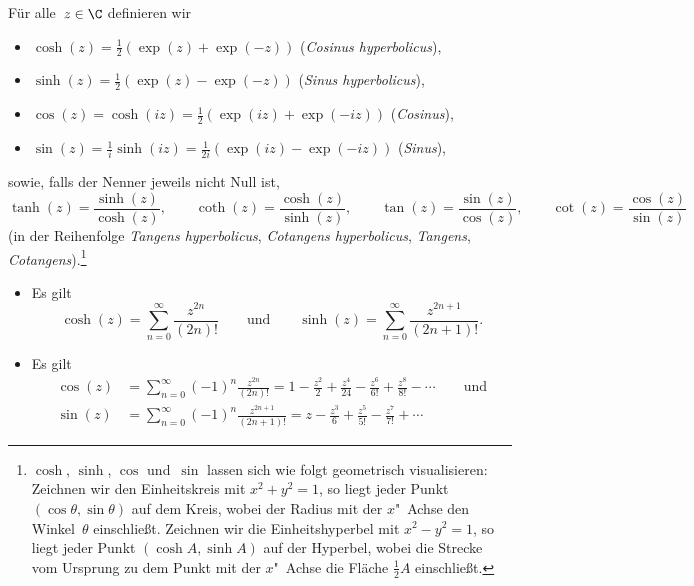 \documentclass[a4paper]{article}
\begin{document}
\begin{definition}
    Für alle~$z \in \C$ definieren wir
    \begin{itemize}
        \item $\cosh(z) = \frac{1}{2}(\exp(z)+\exp(-z))$ (\emph{Cosinus hyperbolicus}),
        \item $\sinh(z) = \frac{1}{2}(\exp(z)-\exp(-z))$ (\emph{Sinus hyperbolicus}),
        \item $\cos(z) = \cosh(iz) = \frac{1}{2}(\exp(iz)+\exp(-iz))$ (\emph{Cosinus}),
        \item $\sin(z) = \frac{1}{i}\sinh(iz) = \frac{1}{2i}(\exp(iz)-\exp(-iz))$ (\emph{Sinus}),
    \end{itemize}
    sowie, falls der Nenner jeweils nicht Null ist,
    \begin{equation*}
        \tanh(z) = \frac{\sinh(z)}{\cosh(z)}, \qquad \coth(z) = \frac{\cosh(z)}{\sinh(z)}, \qquad \tan(z) = \frac{\sin(z)}{\cos(z)}, \qquad \cot(z) = \frac{\cos(z)}{\sin(z)}
    \end{equation*}
    (in der Reihenfolge \emph{Tangens hyperbolicus}, \emph{Cotangens hyperbolicus}, \emph{Tangens}, \emph{Cotangens}).\footnote{$\cosh$, $\sinh$, $\cos$ und~$\sin$ lassen sich wie folgt geometrisch visualisieren: Zeichnen wir den Einheitskreis mit $x^2+y^2 = 1$, so liegt jeder Punkt $(\cos\theta,\sin\theta)$ auf dem Kreis, wobei der Radius mit der $x$"~Achse den Winkel~$\theta$ einschließt. Zeichnen wir die Einheitshyperbel mit $x^2-y^2 = 1$, so liegt jeder Punkt $(\cosh A,\sinh A)$ auf der Hyperbel, wobei die Strecke vom Ursprung zu dem Punkt mit der $x$"~Achse die Fläche $\frac{1}{2}A$ einschließt.}
\end{definition}

\begin{theorem}[Reihendarstellung]\leavevmode
    \begin{itemize}
        \item Es gilt
        \begin{equation*}
            \cosh(z) = \sum_{n=0}^\infty \frac{z^{2n}}{(2n)!} \qquad\text{und}\qquad \sinh(z) = \sum_{n=0}^\infty \frac{z^{2n+1}}{(2n+1)!}.
        \end{equation*}
        \item Es gilt
        \begin{align*}
            \cos(z) &= \sum_{n=0}^\infty (-1)^n \frac{z^{2n}}{(2n)!} = 1 - \frac{z^2}{2} + \frac{z^4}{24} - \frac{z^6}{6!} + \frac{z^8}{8!} - \cdots \qquad\text{und} \\
            \sin(z) &= \sum_{n=0}^\infty (-1)^n \frac{z^{2n+1}}{(2n+1)!} = z - \frac{z^3}{6} + \frac{z^5}{5!} - \frac{z^7}{7!} + \cdots
        \end{align*}
    \end{itemize}
\end{theorem}
\end{document}
